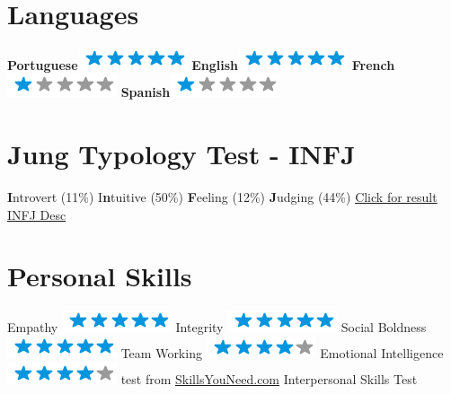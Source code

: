\documentclass[]{friggeri-cv}
\begin{document}
\begin{aside}
~
~
~
  \section{Languages}
    \textbf{Portuguese}\includegraphics[scale=0.40]{img/5stars.png}
    \textbf{English}\includegraphics[scale=0.40]{img/5stars.png}
    \textbf{French}\includegraphics[scale=0.40]{img/1stars.png}
    \textbf{Spanish}\includegraphics[scale=0.40]{img/1stars.png}
~    
  \section{Jung Typology Test - INFJ}
    \textbf{I}ntrovert (11\%)
    I\textbf{n}tuitive (50\%)
    \textbf{F}eeling   (12\%)
    \textbf{J}udging   (44\%)
    \href{http://www.humanmetrics.com/hr/JTypesResult.aspx?EI=-11&SN=-50&TF=-12&JP=44}{\footnotesize Click for result}
    \href{http://www.humanmetrics.com/personality/infj}{\footnotesize INFJ Desc}
~
  \section{Personal Skills}
    Empathy
    \includegraphics[scale=0.40]{img/5stars.png}
    Integrity
    \includegraphics[scale=0.40]{img/5stars.png}
    Social Boldness
    \includegraphics[scale=0.40]{img/5stars.png}
    Team Working
    \includegraphics[scale=0.40]{img/4stars.png}
    Emotional Intelligence
    \includegraphics[scale=0.40]{img/4stars.png}
    \footnotesize test from \href{http://www.skillsyouneed.com/ips/interpersonal-skills-test.html}{SkillsYouNeed.com}
    \footnotesize Interpersonal Skills Test
    ~
\end{aside}
\end{document}
